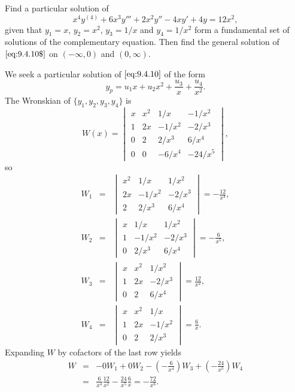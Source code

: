 \documentclass{ximera}
\begin{document}
\begin{example}\label{example:9.4.2}
 Find a particular solution of
\begin{equation} \label{eq:9.4.10}
x^4y^{(4)}+6x^3y'''+2x^2y''-4xy'+4y=12x^2,
\end{equation}
given that  $y_1=x$, $y_2=x^2$, $y_3=1/x$ and $y_4=1/x^2$ form a
fundamental set of solutions of the complementary equation. Then find
the general solution of $\eqref{eq:9.4.10$}$ on $(-\infty,0)$ and
$(0,\infty)$.
 

\begin{explanation}
We seek a particular solution of $\eqref{eq:9.4.10}$ of the form
$$
y_p=u_1x+u_2x^2+\frac{u_3}{x}+\frac{u_4}{x^2}.
$$
The Wronskian of  $\{y_1,y_2,y_3,y_4\}$ is
$$
W(x)=\begin{vmatrix}
 x&x^2&1/x&-1/x^2 \\
 1&2x&-1/x^2&-2/x^3 \\
 0&2&2/x^3&6/x^4\\
0&0&-6/x^4&-24/x^5
\end{vmatrix},
$$
so
\begin{eqnarray*}
W_1&=&
\begin{vmatrix}
x^2&1/x&1/x^2\\
2x&-1/x^2&-2/x^3\\
2&2/x^3&6/x^4
\end{vmatrix}=-\frac{12}{x^4},\\
W_2&=&
\begin{vmatrix}
x&1/x&1/x^2\\
1&-1/x^2&-2/x^3\\
0&2/x^3&6/x^4
\end{vmatrix}=-\frac{6}{x^5},\\
W_3&=&
\begin{vmatrix}
x&x^2&1/x^2\\
1&2x&-2/x^3\\
0&2&6/x^4
\end{vmatrix} =\frac{12}{x^2},  \\
W_4&=&
\begin{vmatrix}
x&x^2&1/x\\
1&2x&-1/x^2\\
0&2&2/x^3
\end{vmatrix}=\frac{6}{x}.
\end{eqnarray*}
Expanding $W$ by cofactors of the last row yields
\begin{eqnarray*}
W&=&-0W_1+0 W_2-\left(-\frac{6}{x^4}\right)W_3+\left(-\frac{24}{x^5}\right)W_4\\
&=&\frac{6}{x^4}\frac{12}{x^2}-\frac{24}{x^5}\frac{6}{x}=-\frac{72}{x^6}.

\end{eqnarray*}
\end{explanation}
\end{example}
\end{document}
